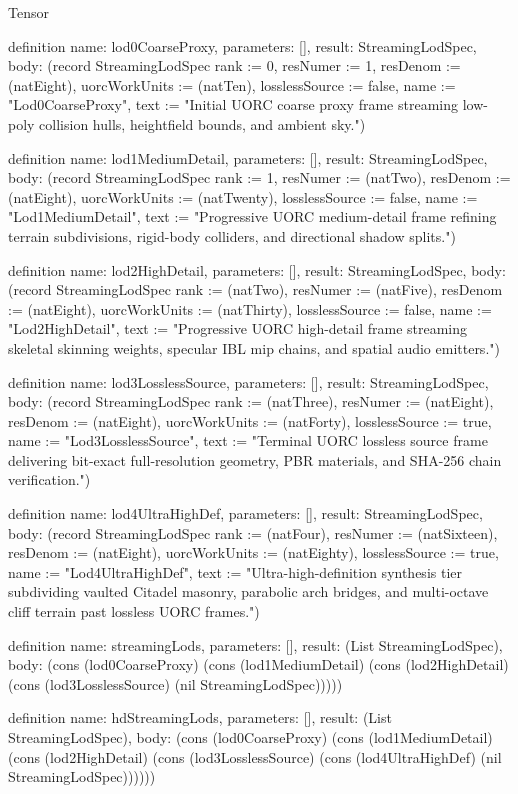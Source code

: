 \begin{lexlean}{Tensor}
\begin{semanticmodule}
definition{
  name: lod0CoarseProxy,
  parameters: [],
  result: StreamingLodSpec,
  body: (record StreamingLodSpec {rank := 0, resNumer := 1, resDenom := (natEight), uorcWorkUnits := (natTen), losslessSource := false, name := "Lod0CoarseProxy", text := "Initial UORC coarse proxy frame streaming low-poly collision hulls, heightfield bounds, and ambient sky."})
}

definition{
  name: lod1MediumDetail,
  parameters: [],
  result: StreamingLodSpec,
  body: (record StreamingLodSpec {rank := 1, resNumer := (natTwo), resDenom := (natEight), uorcWorkUnits := (natTwenty), losslessSource := false, name := "Lod1MediumDetail", text := "Progressive UORC medium-detail frame refining terrain subdivisions, rigid-body colliders, and directional shadow splits."})
}

definition{
  name: lod2HighDetail,
  parameters: [],
  result: StreamingLodSpec,
  body: (record StreamingLodSpec {rank := (natTwo), resNumer := (natFive), resDenom := (natEight), uorcWorkUnits := (natThirty), losslessSource := false, name := "Lod2HighDetail", text := "Progressive UORC high-detail frame streaming skeletal skinning weights, specular IBL mip chains, and spatial audio emitters."})
}

definition{
  name: lod3LosslessSource,
  parameters: [],
  result: StreamingLodSpec,
  body: (record StreamingLodSpec {rank := (natThree), resNumer := (natEight), resDenom := (natEight), uorcWorkUnits := (natForty), losslessSource := true, name := "Lod3LosslessSource", text := "Terminal UORC lossless source frame delivering bit-exact full-resolution geometry, PBR materials, and SHA-256 chain verification."})
}

definition{
  name: lod4UltraHighDef,
  parameters: [],
  result: StreamingLodSpec,
  body: (record StreamingLodSpec {rank := (natFour), resNumer := (natSixteen), resDenom := (natEight), uorcWorkUnits := (natEighty), losslessSource := true, name := "Lod4UltraHighDef", text := "Ultra-high-definition synthesis tier subdividing vaulted Citadel masonry, parabolic arch bridges, and multi-octave cliff terrain past lossless UORC frames."})
}

definition{
  name: streamingLods,
  parameters: [],
  result: (List StreamingLodSpec),
  body: (cons (lod0CoarseProxy) (cons (lod1MediumDetail) (cons (lod2HighDetail) (cons (lod3LosslessSource) (nil StreamingLodSpec)))))
}

definition{
  name: hdStreamingLods,
  parameters: [],
  result: (List StreamingLodSpec),
  body: (cons (lod0CoarseProxy) (cons (lod1MediumDetail) (cons (lod2HighDetail) (cons (lod3LosslessSource) (cons (lod4UltraHighDef) (nil StreamingLodSpec))))))
}


\end{semanticmodule}
\end{lexlean}
